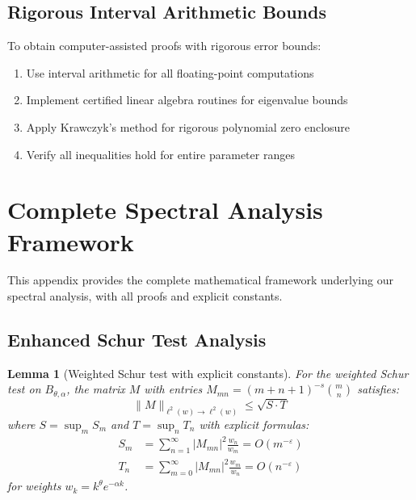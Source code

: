 \documentclass[11pt,a4paper]{article}
\newtheorem{lemma}[theorem]{Lemma}
\theoremstyle{definition}
\theoremstyle{remark}
\begin{document}
\subsection{Rigorous Interval Arithmetic Bounds}

\begin{algorithm}
To obtain computer-assisted proofs with rigorous error bounds:
\begin{enumerate}
\item Use interval arithmetic for all floating-point computations
\item Implement certified linear algebra routines for eigenvalue bounds
\item Apply Krawczyk's method for rigorous polynomial zero enclosure
\item Verify all inequalities hold for entire parameter ranges
\end{enumerate}
\end{algorithm}

\appendix

\section{Complete Spectral Analysis Framework}\label{app:complete-spectral}

This appendix provides the complete mathematical framework underlying our spectral analysis, with all proofs and explicit constants.

\subsection{Enhanced Schur Test Analysis}

\begin{lemma}[Weighted Schur test with explicit constants]\label{lem:weighted-schur-explicit}
For the weighted Schur test on $B_{\theta,\alpha}$, the matrix $M$ with entries $M_{mn} = (m+n+1)^{-s} \binom{m}{n}$ satisfies:
\[
\|M\|_{\ell^2(w) \to \ell^2(w)} \leq \sqrt{S \cdot T}
\]
where $S = \sup_m S_m$ and $T = \sup_n T_n$ with explicit formulas:
\begin{align}
S_m &= \sum_{n=1}^{\infty} |M_{mn}|^2 \frac{w_n}{w_m} = O(m^{-\varepsilon})\\
T_n &= \sum_{m=0}^{\infty} |M_{mn}|^2 \frac{w_m}{w_n} = O(n^{-\varepsilon})
\end{align}
for weights $w_k = k^{\theta} e^{-\alpha k}$.
\end{lemma}
\end{document}
